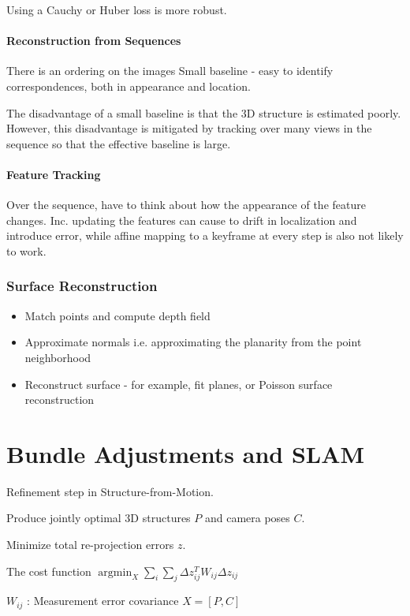 Using a Cauchy or Huber loss is more robust.

\paragraph{Reconstruction from Sequences}

There is an ordering on the images
Small baseline - easy to identify correspondences, both in appearance and location.

The disadvantage of a small baseline is that the 3D structure is estimated poorly. However, this disadvantage is mitigated by tracking over many views in the sequence so that the effective baseline is large.

\paragraph{Feature Tracking}

Over the sequence, have to think about how the appearance of the feature changes.
Inc. updating the features can cause to drift in localization and introduce error, while affine mapping to a keyframe at every step is also not likely to work.

\subsubsection{Surface Reconstruction}
\begin{itemize}
\item Match points and compute depth field
\item Approximate normals i.e. approximating the planarity from the point neighborhood
\item  Reconstruct surface - for example, fit planes, or Poisson surface reconstruction
\end{itemize}

\section{Bundle Adjustments and SLAM}

Refinement step in Structure-from-Motion.

Produce jointly optimal 3D structures $P$ and camera poses $C$.

Minimize total re-projection errors $z$.

The cost function $\operatorname{argmin}_X \sum_i \sum_j \Delta z_{ij}^T W_{ij} \Delta z_{ij} $

$W_{ij}$ : Measurement error covariance
$X = [P,C]$


